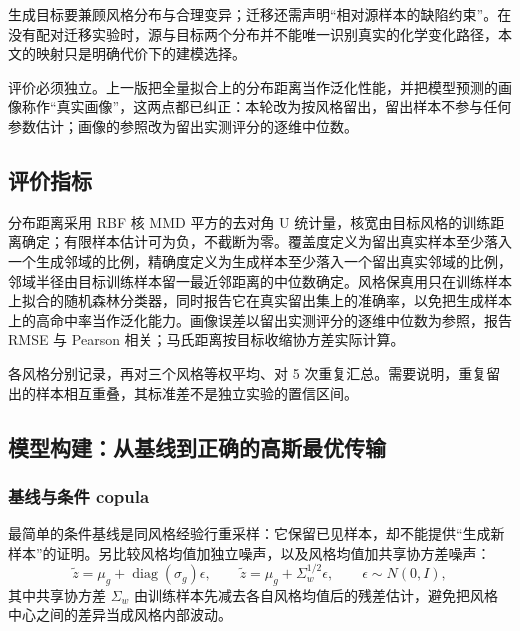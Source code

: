 \documentclass[UTF8,a4paper,zihao=-4]{ctexart}
\numberwithin{figure}{section}
\numberwithin{table}{section}
\numberwithin{equation}{section}
\begin{document}
生成目标要兼顾风格分布与合理变异；迁移还需声明“相对源样本的缺陷约束”。在没有配对迁移实验时，源与目标两个分布并不能唯一识别真实的化学变化路径，本文的映射只是明确代价下的建模选择。

评价必须独立。上一版把全量拟合上的分布距离当作泛化性能，并把模型预测的画像称作“真实画像”，这两点都已纠正：本轮改为按风格留出，留出样本不参与任何参数估计；画像的参照改为留出实测评分的逐维中位数。

\subsection{评价指标}

分布距离采用 RBF 核 MMD 平方的去对角 U 统计量，核宽由目标风格的训练距离确定；有限样本估计可为负，不截断为零。覆盖度定义为留出真实样本至少落入一个生成邻域的比例，精确度定义为生成样本至少落入一个留出真实邻域的比例，邻域半径由目标训练样本留一最近邻距离的中位数确定。风格保真用只在训练样本上拟合的随机森林分类器，同时报告它在真实留出集上的准确率，以免把生成样本上的高命中率当作泛化能力。画像误差以留出实测评分的逐维中位数为参照，报告 RMSE 与 Pearson 相关；马氏距离按目标收缩协方差实际计算。

各风格分别记录，再对三个风格等权平均、对 5 次重复汇总。需要说明，重复留出的样本相互重叠，其标准差不是独立实验的置信区间。

\subsection{模型构建：从基线到正确的高斯最优传输}

\subsubsection{基线与条件 copula}

最简单的条件基线是同风格经验行重采样：它保留已见样本，却不能提供“生成新样本”的证明。另比较风格均值加独立噪声，以及风格均值加共享协方差噪声：
\begin{equation}
\tilde z=\mu_g+\operatorname{diag}(\sigma_g)\epsilon,\qquad
\tilde z=\mu_g+\Sigma_w^{1/2}\epsilon,\qquad \epsilon\sim N(0,I),
\label{eq:noise-baseline}
\end{equation}
其中共享协方差 $\Sigma_w$ 由训练样本先减去各自风格均值后的残差估计，避免把风格中心之间的差异当成风格内部波动。
\end{document}
